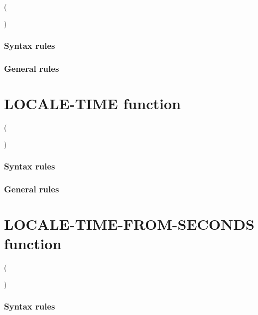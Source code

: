 \begin{syntax}
    ( \argument
  \begin{0-1}
    \argument
  \end{0-1}
  )
\end{syntax}

\subsubsection{Syntax rules}

\subsubsection{General rules}

\section{LOCALE-TIME function}

\begin{syntax}
    ( \argument
  \begin{0-1}
    \argument
  \end{0-1}
  )
\end{syntax}

\subsubsection{Syntax rules}

\subsubsection{General rules}

\section{LOCALE-TIME-FROM-SECONDS function}

\begin{syntax}
    ( \argument
  \begin{0-1}
    \argument
  \end{0-1}
  )
\end{syntax}

\subsubsection{Syntax rules}

